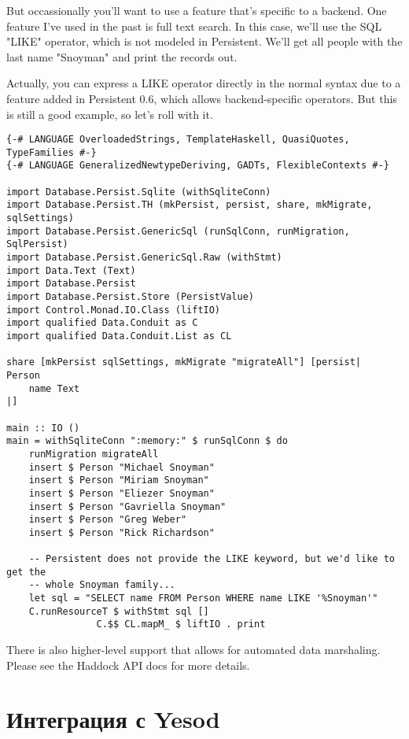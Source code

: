 But occassionally you'll want to use a feature that's specific to a backend. One feature I've used in the past is full text search. In this case, we'll use the SQL "LIKE" operator, which is not modeled in Persistent. We'll get all people with the last name "Snoyman" and print the records out.

Actually, you can express a LIKE operator directly in the normal syntax due to a feature added in Persistent 0.6, which allows backend-specific operators. But this is still a good example, so let's roll with it.

\begin{lstlisting}
{-# LANGUAGE OverloadedStrings, TemplateHaskell, QuasiQuotes, TypeFamilies #-}
{-# LANGUAGE GeneralizedNewtypeDeriving, GADTs, FlexibleContexts #-}

import Database.Persist.Sqlite (withSqliteConn)
import Database.Persist.TH (mkPersist, persist, share, mkMigrate, sqlSettings)
import Database.Persist.GenericSql (runSqlConn, runMigration, SqlPersist)
import Database.Persist.GenericSql.Raw (withStmt)
import Data.Text (Text)
import Database.Persist
import Database.Persist.Store (PersistValue)
import Control.Monad.IO.Class (liftIO)
import qualified Data.Conduit as C
import qualified Data.Conduit.List as CL

share [mkPersist sqlSettings, mkMigrate "migrateAll"] [persist|
Person
    name Text
|]

main :: IO ()
main = withSqliteConn ":memory:" $ runSqlConn $ do
    runMigration migrateAll
    insert $ Person "Michael Snoyman"
    insert $ Person "Miriam Snoyman"
    insert $ Person "Eliezer Snoyman"
    insert $ Person "Gavriella Snoyman"
    insert $ Person "Greg Weber"
    insert $ Person "Rick Richardson"

    -- Persistent does not provide the LIKE keyword, but we'd like to get the
    -- whole Snoyman family...
    let sql = "SELECT name FROM Person WHERE name LIKE '%Snoyman'"
    C.runResourceT $ withStmt sql []
                C.$$ CL.mapM_ $ liftIO . print
\end{lstlisting}%

There is also higher-level support that allows for automated data marshaling. Please see the Haddock API docs for more details.

\section{Интеграция с Yesod} %


